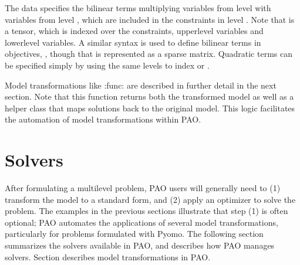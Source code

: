 \documentclass[letterpaper,10pt,english]{sphinxmanual}
\begin{document}
The data  specifies the bilinear terms multiplying
variables from level  with variables from level , which
are included in the constraints in level .  Note that  is a
tensor, which is indexed over the constraints, upper\sphinxhyphen{}level variables
and lower\sphinxhyphen{}level variables.  A similar syntax is used to define bilinear
terms in objectives, , though that is represented as a sparse matrix.
Quadratic terms can be specified simply by using the same levels to index
 or .

Model transformations like :func: are
described in further detail in the next section.  Note that this function
returns both the transformed model as well as a helper class that maps
solutions back to the original model.  This logic facilitates the
automation of model transformations within PAO.


\section{Solvers}
\label{\detokenize{solvers:solvers}}\label{\detokenize{solvers::doc}}
After formulating a multilevel problem, PAO users will generally need to
(1) transform the model to a standard form, and (2) apply an optimizer
to solve the problem.  The examples in the previous sections illustrate
that step (1) is often optional;  PAO automates the applications of
several model transformations, particularly for problems formulated with
Pyomo.  The following section summarizes the solvers available in PAO,
and describes how PAO manages solvers. Section 
describes model transformations in PAO.
\end{document}
